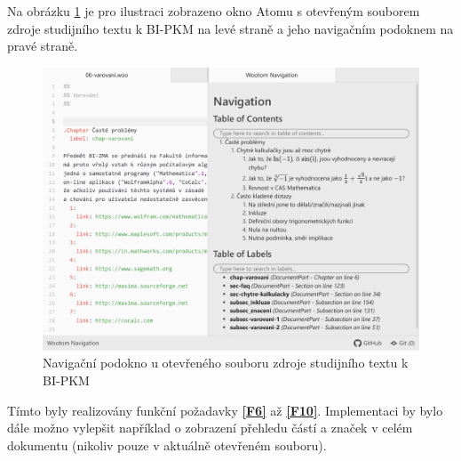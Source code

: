 Na obrázku \ref{navigace-pkm} je pro ilustraci zobrazeno okno Atomu s otevřeným souborem zdroje studijního textu k
BI-PKM na levé straně a jeho navigačním podoknem na pravé straně.

\begin{figure}\centering
    \includegraphics[width=1.0\textwidth]{content/realizace/navigace-pkm}
 	\caption[Navigace v dokumentu]{Navigační podokno u otevřeného souboru zdroje studijního textu k BI-PKM \cite{pkm}}
    \label{navigace-pkm}
\end{figure}

Tímto byly realizovány funkční požadavky \textbf{\ref{F6}} až \textbf{\ref{F10}}. Implementaci by bylo dále možno
vylepšit například o zobrazení přehledu částí a značek v celém dokumentu (nikoliv pouze v aktuálně otevřeném souboru).
